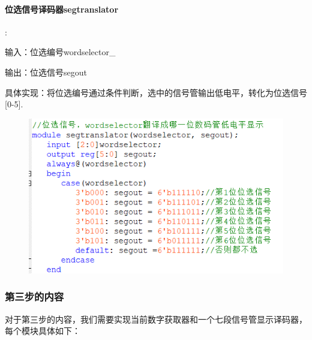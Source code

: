 \documentclass[UTF8]{ctexart}
\begin{document}
\paragraph{位选信号译码器segtranslator}:\par
输入：位选编号wordselector\_\par
输出：位选信号segout\par
具体实现：将位选编号通过条件判断，选中的信号管输出低电平，转化为位选信号[0-5].
\begin{figure}[H]\begin{center}
    \includegraphics[scale=1]{segtranslator.PNG}
\end{center}\end{figure}

\subsubsection{第三步的内容}

对于第三步的内容，我们需要实现当前数字获取器和一个七段信号管显示译码器，每个模块具体如下：\\
\end{document}
